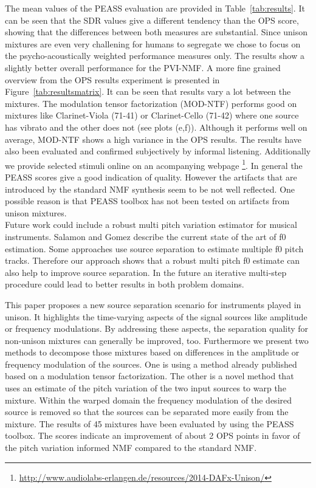 The mean values of the PEASS evaluation are provided in Table~\ref{tab:results}. It can be seen that the SDR values give a different tendency than the OPS score, showing that the differences between both measures are substantial. Since unison mixtures are even very challening for humans to segregate we chose to focus on the psycho-acoustically weighted performance measures only. The results show a slightly better overall performance for the PVI-NMF. A more fine grained overview from the OPS results experiment is presented in Figure~\ref{tab:resultsmatrix}. It can be seen that results vary a lot between the mixtures. The modulation tensor factorization (MOD-NTF) performs good on mixtures like Clarinet-Viola (71-41) or Clarinet-Cello (71-42)  where one source has vibrato and the other does not (see plots (e,f)). Although it performs well on average, MOD-NTF shows a high variance in the OPS results. The results have also been evaluated and confirmed subjectively by informal listening. Additionally we provide selected stimuli online on an acompanying webpage \footnote{\url{http://www.audiolabs-erlangen.de/resources/2014-DAFx-Unison/}}. In general the PEASS scores give a good indication of quality. However the artifacts that are introduced by the standard NMF synthesis seem to be not well reflected. One possible reason is that PEASS toolbox has not been tested on artifacts from unison mixtures. \\
Future work could include a robust multi pitch variation estimator for musical instruments. Salamon and Gomez \cite{salamon2012melody} describe the current state of the art of f0 estimation. Some approaches use source separation to estimate multiple f0 pitch tracks. Therefore our approach shows that a robust multi pitch f0 estimate can also help to improve source separation. In the future an iterative multi-step procedure could lead to better results in both problem domains.

This paper proposes a new source separation scenario for instruments played in unison. It highlights the time-varying aspects of the signal sources like amplitude or frequency modulations. By addressing these aspects, the separation quality for non-unison mixtures can generally be improved, too.
Furthermore we present two methods to decompose those mixtures based on differences in the amplitude or frequency modulation of the sources. One is using a method already published based on a modulation tensor factorization. The other is a novel method that uses an estimate of the pitch variation of the two input sources to warp the mixture. Within the warped domain the frequency modulation of the desired source is removed so that the sources can be separated more easily from the mixture. The results of 45 mixtures have been evaluated by using the PEASS toolbox. The scores indicate an improvement of about 2 OPS points in favor of the pitch variation informed NMF compared to the standard NMF.

